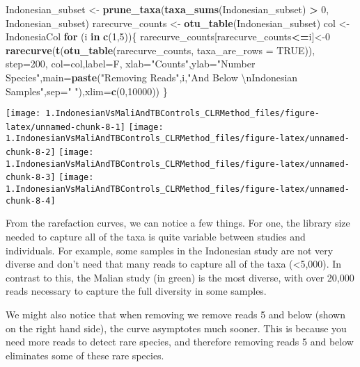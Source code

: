 \documentclass[]{article}
\newenvironment{Shaded}{\begin{snugshade}}{\end{snugshade}}
\newcommand{\CharTok}[1]{\textcolor[rgb]{0.31,0.60,0.02}{#1}}
\newcommand{\ControlFlowTok}[1]{\textcolor[rgb]{0.13,0.29,0.53}{\textbf{#1}}}
\newcommand{\DataTypeTok}[1]{\textcolor[rgb]{0.13,0.29,0.53}{#1}}
\newcommand{\DecValTok}[1]{\textcolor[rgb]{0.00,0.00,0.81}{#1}}
\newcommand{\KeywordTok}[1]{\textcolor[rgb]{0.13,0.29,0.53}{\textbf{#1}}}
\newcommand{\NormalTok}[1]{#1}
\newcommand{\OperatorTok}[1]{\textcolor[rgb]{0.81,0.36,0.00}{\textbf{#1}}}
\newcommand{\OtherTok}[1]{\textcolor[rgb]{0.56,0.35,0.01}{#1}}
\newcommand{\StringTok}[1]{\textcolor[rgb]{0.31,0.60,0.02}{#1}}
\begin{document}
\begin{Shaded}
\begin{Highlighting}[]
\NormalTok{Indonesian_subset <-}\StringTok{ }\KeywordTok{prune_taxa}\NormalTok{(}\KeywordTok{taxa_sums}\NormalTok{(Indonesian_subset) }\OperatorTok{>}\StringTok{ }\DecValTok{0}\NormalTok{, Indonesian_subset)}
\NormalTok{rarecurve_counts <-}\StringTok{ }\KeywordTok{otu_table}\NormalTok{(Indonesian_subset)}
\NormalTok{col <-}\StringTok{ }\NormalTok{IndonesiaCol}
\ControlFlowTok{for}\NormalTok{ (i }\ControlFlowTok{in} \KeywordTok{c}\NormalTok{(}\DecValTok{1}\NormalTok{,}\DecValTok{5}\NormalTok{))\{}
\NormalTok{    rarecurve_counts[rarecurve_counts}\OperatorTok{<=}\NormalTok{i]<-}\DecValTok{0}
    \KeywordTok{rarecurve}\NormalTok{(}\KeywordTok{t}\NormalTok{(}\KeywordTok{otu_table}\NormalTok{(rarecurve_counts, }\DataTypeTok{taxa_are_rows =} \OtherTok{TRUE}\NormalTok{)), }\DataTypeTok{step=}\DecValTok{200}\NormalTok{, }\DataTypeTok{col=}\NormalTok{col,}\DataTypeTok{label=}\NormalTok{F, }\DataTypeTok{xlab=}\StringTok{"Counts"}\NormalTok{,}\DataTypeTok{ylab=}\StringTok{"Number Species"}\NormalTok{,}\DataTypeTok{main=}\KeywordTok{paste}\NormalTok{(}\StringTok{"Removing Reads"}\NormalTok{,i,}\StringTok{"And Below }\CharTok{\textbackslash{}n}\StringTok{Indonesian Samples"}\NormalTok{,}\DataTypeTok{sep=}\StringTok{" "}\NormalTok{),}\DataTypeTok{xlim=}\KeywordTok{c}\NormalTok{(}\DecValTok{0}\NormalTok{,}\DecValTok{10000}\NormalTok{))}
\NormalTok{\}}
\end{Highlighting}
\end{Shaded}

\texttt{[image: 1.IndonesianVsMaliAndTBControls\_CLRMethod\_files/figure-latex/unnamed-chunk-8-1]}
\texttt{[image: 1.IndonesianVsMaliAndTBControls\_CLRMethod\_files/figure-latex/unnamed-chunk-8-2]}
\texttt{[image: 1.IndonesianVsMaliAndTBControls\_CLRMethod\_files/figure-latex/unnamed-chunk-8-3]}
\texttt{[image: 1.IndonesianVsMaliAndTBControls\_CLRMethod\_files/figure-latex/unnamed-chunk-8-4]}

From the rarefaction curves, we can notice a few things. For one, the
library size needed to capture all of the taxa is quite variable between
studies and individuals. For example, some samples in the Indonesian
study are not very diverse and don't need that many reads to capture all
of the taxa (\textless{}5,000). In contrast to this, the Malian study
(in green) is the most diverse, with over 20,000 reads necessary to
capture the full diversity in some samples.

We might also notice that when removing we remove reads 5 and below
(shown on the right hand side), the curve asymptotes much sooner. This
is because you need more reads to detect rare species, and therefore
removing reads 5 and below eliminates some of these rare species.
\end{document}
